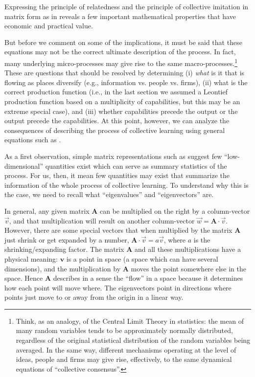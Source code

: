\documentclass[12pt]{article}
\newcommand{\mtx}[1]{\mathbf{ #1}}
\begin{document}
Expressing the principle of relatedness and the principle of collective imitation in matrix form as in  reveals a few important mathematical properties that have economic and practical value. 

But before we comment on some of the implications, it must be said that these equations may not be the correct ultimate description of the process. In fact, many underlying micro-processes may give rise to the same macro-processes.\footnote{Think, as an analogy, of the Central Limit Theory in statistics: the mean of many random variables tends to be approximately normally distributed, regardless of the original statistical distribution of the random variables being averaged. In the same way, different mechanisms operating at the level of ideas, people and firms may give rise, effectively, to the same dynamical equations of ``collective consensus''.} These are questions that should be resolved by determining (i) \emph{what} is it that is flowing as places diversify (e.g., information vs. people vs. firms), (ii) what is the correct production function (i.e., in the last section we assumed a Leontief production function based on a multiplicity of capabilities, but this may be an extreme special case), and (iii) whether capabilities precede the output or the output precede the capabilities. At this point, however, we can analyze the consequences of describing the process of collective learning using general equations such as .

As a first observation, simple matrix representations such as  suggest few ``low-dimensional'' quantities exist which can serve as summary statistics of the process. For us, then, it mean few quantities may exist that summarize the information of the whole process of collective learning. To understand why this is the case, we need to recall what ``eigenvalues'' and ``eigenvectors'' are. 

In general, any given matrix $\mtx{A}$ can be multiplied on the right by a column-vector $\vec{v}$, and that multiplication will result on another column-vector $\vec{w}=\mtx{A}\cdot\vec{v}$. However, there are some special vectors that when multiplied by the matrix $\mtx{A}$ just shrink or get expanded by a number, $\mtx{A}\cdot\vec{v} = a\vec{v}$, where $a$ is the shrinking/expanding factor. The matrix $\mtx{A}$ and all these multiplications have a physical meaning: $\mtx{v}$ is a point in space (a space which can have several dimensions), and the multiplication by $\mtx{A}$ moves the point somewhere else in the space. Hence $\mtx{A}$ describes in a sense the ``flow'' in a space because it determines how each point will move where. The eigenvectors point in directions where points just move to or away from the origin in a linear way.
\end{document}
